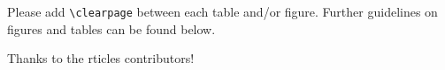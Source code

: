 \documentclass[gmd, manuscript]{copernicus}
\begin{document}
Please add \texttt{\textbackslash{}clearpage} between each table and/or
figure. Further guidelines on figures and tables can be found below.
\noappendix




\begin{acknowledgements}
Thanks to the rticles contributors!
\end{acknowledgements}







\end{document}
